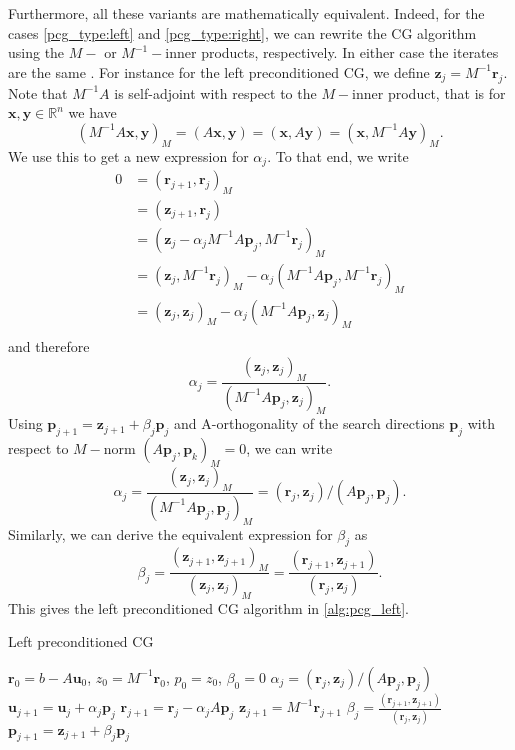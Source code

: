Furthermore, all these variants are mathematically equivalent. Indeed, for the cases \ref{pcg_type:left} and \ref{pcg_type:right}, we can rewrite the CG algorithm using the $M-$ or $M^{-1}-$inner products, respectively. In either case the iterates are the same \cite[Section 9.2]{iter_method_saad}. For instance for the left preconditioned CG, we define $\mathbf{z}_j = M^{-1}\mathbf{r}_j$. Note that $M^{-1}A$ is self-adjoint with respect to the $M-$inner product, that is for $\mathbf{x},\mathbf{y}\in\mathbb{R}^n$ we have
\[
  (M^{-1}A\mathbf{x}, \mathbf{y})_M = (A\mathbf{x}, \mathbf{y}) = (\mathbf{x}, A\mathbf{y}) = (\mathbf{x}, M^{-1}A\mathbf{y})_M.
\]
We use this to get a new expression for $\alpha_j$. To that end, we write
\begin{align*}
  0 & = (\mathbf{r}_{j+1}, \mathbf{r}_j)_M                                        \\
    & = (\mathbf{z}_{j+1}, \mathbf{r}_j)                                                   \\
    & = (\mathbf{z}_j - \alpha_j M^{-1}A\mathbf{p}_j, M^{-1}\mathbf{r}_j)_M                         \\
    & = (\mathbf{z}_j, M^{-1}\mathbf{r}_j)_M - \alpha_j (M^{-1}A\mathbf{p}_j, M^{-1}\mathbf{r}_j)_M \\
    & = (\mathbf{z}_j, \mathbf{z}_j)_M - \alpha_j (M^{-1}A\mathbf{p}_j, \mathbf{z}_j)_M                               \\
\end{align*}
and therefore
\[
  \alpha_j = \frac{(\mathbf{z}_j, \mathbf{z}_j)_M}{(M^{-1}A\mathbf{p}_j, \mathbf{z}_j)_M}.
\]
Using $\mathbf{p}_{j+1} = \mathbf{z}_{j+1} + \beta_j \mathbf{p}_j$ and A-orthogonality of the search directions $\mathbf{p}_j$ with respect to $M-$norm $(A\mathbf{p}_j, \mathbf{p}_k)_M = 0$, we can write
\[
  \alpha_j = \frac{(\mathbf{z}_j, \mathbf{z}_j)_M}{(M^{-1}A\mathbf{p}_j, \mathbf{p}_j)_M} = (\mathbf{r}_j, \mathbf{z}_j) / (A\mathbf{p}_j, \mathbf{p}_j).
\]
Similarly, we can derive the equivalent expression for $\beta_j$ as
\[
  \beta_j = \frac{(\mathbf{z}_{j+1}, \mathbf{z}_{j+1})_M}{(\mathbf{z}_j, \mathbf{z}_j)_M} = \frac{(\mathbf{r}_{j+1}, \mathbf{z}_{j+1})}{(\mathbf{r}_j, \mathbf{z}_j)}.
\]
This gives the left preconditioned CG algorithm in \ref{alg:pcg_left}.
\begin{algorithm}[H]
  \caption{Left preconditioned CG \cite[Algorithm 9.1]{iter_method_saad}}
  \label{alg:pcg_left}
  \begin{algorithmic}
    \State $\mathbf{r}_0 = b - A\mathbf{u}_0$, $z_0 = M^{-1}\mathbf{r}_0$, $p_0 = z_0$, $\beta_0 = 0$
    \State $\alpha_j = (\mathbf{r}_j, \mathbf{z}_j) / (A\mathbf{p}_j, \mathbf{p}_j)$
    \State $\mathbf{u}_{j+1} = \mathbf{u}_j + \alpha_j \mathbf{p}_j$
    \State $\mathbf{r}_{j+1} = \mathbf{r}_j - \alpha_j A \mathbf{p}_j$
    \State $\mathbf{z}_{j+1} = M^{-1}\mathbf{r}_{j+1}$
    \State $\beta_j = \frac{(\mathbf{r}_{j+1}, \mathbf{z}_{j+1})}{(\mathbf{r}_j, \mathbf{z}_j)}$
    \State $\mathbf{p}_{j+1} = \mathbf{z}_{j+1} + \beta_j \mathbf{p}_j$
    \EndFor
  \end{algorithmic}
\end{algorithm}
